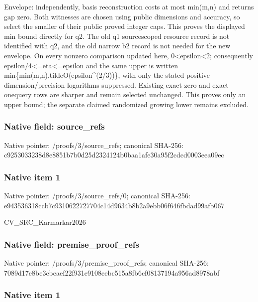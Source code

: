 \documentclass[10pt,a4paper]{article}
\begin{document}
Envelope: independently, basis reconstruction costs at most min(m,n) and returns gap zero. Both witnesses are chosen using public dimensions and accuracy, so select the smaller of their public proved integer caps. This proves the displayed min bound directly for q2. The old q1 sourcescoped resource record is not identified with q2, and the old narrow b2 record is not needed for the new envelope. On every nonzero comparison updated here, 0<epsilon<2; consequently epsilon/4<=eta<=epsilon and the same upper is written min\{min(m,n),tildeO(epsilon\textasciicircum{}(2/3))\}, with only the stated positive dimension/precision logarithms suppressed. Existing exact zero and exact onequery rows are sharper and remain selected unchanged. This proves only an upper bound; the separate claimed randomized growing lower remains excluded.


\subsubsection{Native field: source\_refs}


Native pointer: /proofs/3/source\_refs; canonical SHA-256: c9253033238d8e8851b7b0d2\allowbreak{}5d2324124b0baa1afe30a95f\allowbreak{}2cdcd0003eea09ec



\subsubsection{Native item 1}


Native pointer: /proofs/3/source\_refs/0; canonical SHA-256: e943536318ccb7c931062272\allowbreak{}7704c14d9634b8b2a9ebb06f\allowbreak{}646fbdad99afb067


CV\_SRC\_Karmarkar2026


\subsubsection{Native field: premise\_proof\_refs}


Native pointer: /proofs/3/premise\_proof\_refs; canonical SHA-256: 7089d17e8be3cbeaef22f931\allowbreak{}e9108eebc515a8fb6cf08137\allowbreak{}194a956ad8978abf



\subsubsection{Native item 1}
\end{document}
